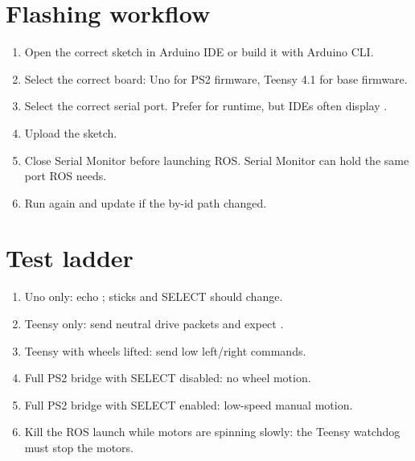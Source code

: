 \section{Flashing workflow}
\begin{enumerate}
  \item Open the correct sketch in Arduino IDE or build it with Arduino CLI.
  \item Select the correct board: Uno for PS2 firmware, Teensy 4.1 for base firmware.
  \item Select the correct serial port.  Prefer  for runtime, but IDEs often display .
  \item Upload the sketch.
  \item Close Serial Monitor before launching ROS.  Serial Monitor can hold the same port ROS needs.
  \item Run  again and update  if the by-id path changed.
\end{enumerate}

\section{Test ladder}
\begin{enumerate}
  \item Uno only: echo ; sticks and SELECT should change.
  \item Teensy only: send neutral drive packets and expect .
  \item Teensy with wheels lifted: send low left/right commands.
  \item Full PS2 bridge with SELECT disabled: no wheel motion.
  \item Full PS2 bridge with SELECT enabled: low-speed manual motion.
  \item Kill the ROS launch while motors are spinning slowly: the Teensy watchdog must stop the motors.
\end{enumerate}
